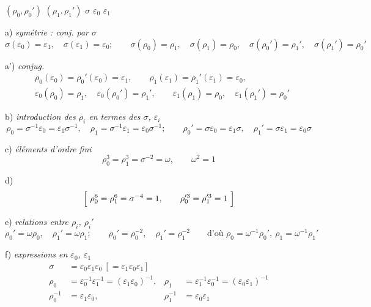 \documentclass[11pt,a4paper]{article}
\begin{document}
$(\rho_0, \rho_0')$ \quad $(\rho_1, \rho_1')$ \quad $\sigma$ \quad $\varepsilon_0$ \quad $\varepsilon_1$

a) \emph{symétrie : conj. par $\sigma$}
\[
\sigma(\varepsilon_0) = \varepsilon_1, \quad \sigma(\varepsilon_1) = \varepsilon_0;
\qquad
\sigma(\rho_0) = \rho_1, \quad \sigma(\rho_1) = \rho_0, \quad
\sigma(\rho_0') = \rho_1', \quad \sigma(\rho_1') = \rho_0'
\]

a') \emph{conjug.}
\[
\begin{aligned}
&\rho_0(\varepsilon_0) = \rho_0'(\varepsilon_0) = \varepsilon_1, \qquad
\rho_1(\varepsilon_1) = \rho_1'(\varepsilon_1) = \varepsilon_0, \\
&\varepsilon_0(\rho_0) = \rho_1, \quad \varepsilon_0(\rho_0') = \rho_1', \qquad
\varepsilon_1(\rho_1) = \rho_0, \quad \varepsilon_1(\rho_1') = \rho_0'
\end{aligned}
\]


b) \emph{introduction des $\rho_i$ en termes des $\sigma$, $\varepsilon_i$}
\[
\rho_0 = \sigma^{-1}\varepsilon_0 = \varepsilon_1 \sigma^{-1}, \quad
\rho_1 = \sigma^{-1}\varepsilon_1 = \varepsilon_0 \sigma^{-1};
\qquad
\rho_0' = \sigma \varepsilon_0 = \varepsilon_1 \sigma, \quad
\rho_1' = \sigma \varepsilon_1 = \varepsilon_0 \sigma
\]

c) \emph{éléments d'ordre fini}
\[
\rho_0^3 = \rho_1^3 = \sigma^{-2} = \omega, \qquad \omega^2 = 1
\]

d)
\[
\Bigl[\ \rho_0^6 = \rho_1^6 = \sigma^{-4} = 1, \qquad
\rho_0'^3 = \rho_1'^3 = 1 \ \Bigr]
\]

e) \emph{relations entre $\rho_i$, $\rho_i'$}
\[
\rho_0' = \omega \rho_0, \quad \rho_1' = \omega \rho_1; \qquad
\rho_0' = \rho_0^{-2}, \quad \rho_1' = \rho_1^{-2}
\qquad \text{d'où } \rho_0 = \omega^{-1}\rho_0', \ \rho_1 = \omega^{-1}\rho_1'
\]

f) \emph{expressions en $\varepsilon_0$, $\varepsilon_1$}
\[
\begin{aligned}
\sigma &= \varepsilon_0 \varepsilon_1 \varepsilon_0
\ [= \varepsilon_1 \varepsilon_0 \varepsilon_1] \\
\rho_0 &= \varepsilon_0^{-1}\varepsilon_1^{-1} = (\varepsilon_1 \varepsilon_0)^{-1},
& \rho_1 &= \varepsilon_1^{-1}\varepsilon_0^{-1} = (\varepsilon_0 \varepsilon_1)^{-1} \\
\rho_0^{-1} &= \varepsilon_1 \varepsilon_0, & \rho_1^{-1} &= \varepsilon_0 \varepsilon_1
\end{aligned}
\]
\end{document}
